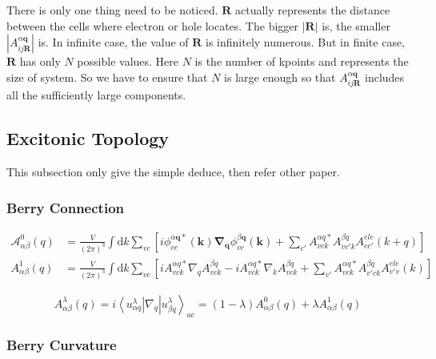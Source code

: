 There is only one thing need to be noticed. 
$\boldsymbol{R}$ actually represents the distance between the cells where electron or hole locates. 
The bigger $|\boldsymbol{R}|$ is, the smaller $|A_{ij\boldsymbol{R}}^{\alpha\boldsymbol{q}}|$ is.
In infinite case, the value of $\boldsymbol{R}$ is infinitely numerous. 
But in finite case, $\boldsymbol{R}$ has only $N$ possible values.
Here $N$ is the number of kpoints and represents the size of system.
So we have to ensure that $N$ is large enough 
so that $A_{ij\boldsymbol{R}}^{\alpha\boldsymbol{q}}$ includes all the sufficiently large components.

\subsection{Excitonic Topology}

This subsection only give the simple deduce, then refer other paper.

\subsubsection{Berry Connection}

\begin{equation}
    \begin{aligned}
        \mathcal{A}_{\alpha \beta}^{0}(q) 
        &= \frac{V}{(2\pi)^3} \int \mathrm{d}k \sum_{vc} \left[
            i \phi_{vc}^{\alpha \boldsymbol{q}*}(\boldsymbol{k}) \boldsymbol{\nabla}_{\boldsymbol{q}} 
            \phi_{vc}^{\beta \boldsymbol{q}} (\boldsymbol{k}) 
            +\sum_{c'} A_{vck}^{\alpha q*} A_{vc'k}^{\beta q} A_{cc'}^{ele}(k+q) 
            \right] \\
        A_{\alpha \beta}^{1}(q) 
        &= \frac{V}{(2\pi)^3} \int \mathrm{d}k \sum_{vc} \left[
            i A_{vck}^{\alpha q*} \nabla_{q} A_{vck}^{\beta q} 
            -i A_{vck}^{\alpha q*} \nabla_{k} A_{vck}^{\beta q} 
            +\sum_{v'} A_{vck}^{\alpha q*} A_{v'ck}^{\beta q} A_{v'v}^{ele}(k) 
            \right] 
    \end{aligned}
\end{equation}

\begin{equation}
    A_{\alpha \beta}^{\lambda}(q) 
    = i \left\langle u_{\alpha q}^{\lambda} \right| \nabla_{q} \left| u_{\beta q}^{\lambda} \right\rangle_{uc} 
    = (1-\lambda) A_{\alpha \beta}^{0}(q) + \lambda A_{\alpha \beta}^{1}(q) 
\end{equation}


\subsubsection{Berry Curvature}



